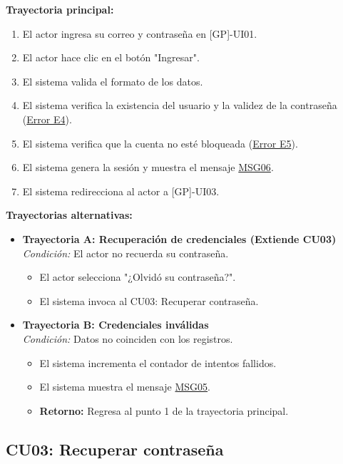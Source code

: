 \begin{appendices}
\textbf{Trayectoria principal:}
\begin{enumerate}[nosep]
    \item El actor ingresa su correo y contraseña en [GP]-UI01.
    \item El actor hace clic en el botón "Ingresar".
    \item El sistema valida el formato de los datos.
    \item El sistema verifica la existencia del usuario y la validez de la contraseña (\hyperlink{err:E4}{Error E4}).
    \item El sistema verifica que la cuenta no esté bloqueada (\hyperlink{err:E5}{Error E5}).
    \item El sistema genera la sesión y muestra el mensaje \hyperlink{msg:MSG06}{MSG06}.
    \item El sistema redirecciona al actor a [GP]-UI03.
\end{enumerate}

\textbf{Trayectorias alternativas:}
\begin{itemize}[leftmargin=*]
    \item \textbf{Trayectoria A: Recuperación de credenciales (Extiende CU03)} \\
    \textit{Condición:} El actor no recuerda su contraseña.
    \begin{itemize}[nosep]
        \item[A-1:] El actor selecciona "¿Olvidó su contraseña?".
        \item[A-2:] El sistema invoca al CU03: Recuperar contraseña.
    \end{itemize}
    \item \textbf{Trayectoria B: Credenciales inválidas} \\
    \textit{Condición:} Datos no coinciden con los registros.
    \begin{itemize}[nosep]
        \item[B-1:] El sistema incrementa el contador de intentos fallidos.
        \item[B-2:] El sistema muestra el mensaje \hyperlink{msg:MSG05}{MSG05}.
        \item \textbf{Retorno:} Regresa al punto 1 de la trayectoria principal.
    \end{itemize}
\end{itemize}


\subsection{CU03: Recuperar contraseña}


\end{appendices}
